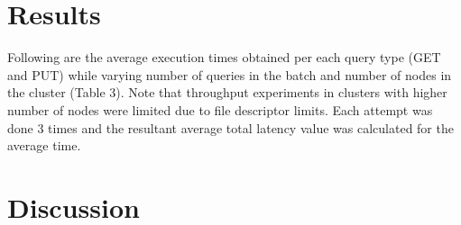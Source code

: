 \documentclass[
    a4paper,
    twocolumn,
]{article}
\begin{document}
\section{Results}

Following are the average execution times obtained per each query type (GET and PUT) while varying number of queries in the batch and number of nodes in the cluster (Table 3). Note that throughput experiments in clusters with higher number of nodes were limited due to file descriptor limits. Each attempt was done 3 times and the resultant average total latency value was calculated for the average time.

\begin{table}[!ht]
	\renewcommand{\arraystretch}{1.5}
	\centering
	\caption{Results of experiments}
\end{table}

\section{Discussion}
\end{document}
